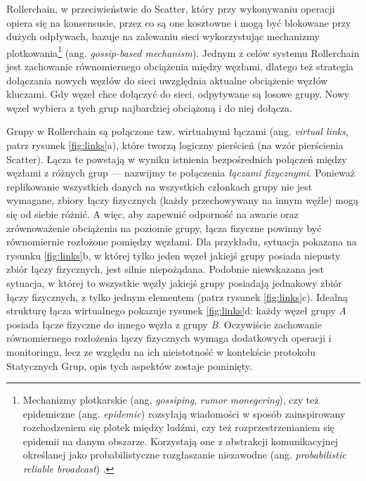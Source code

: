 \documentclass[12pt, twoside, openany]{report}
\begin{document}
Rollerchain, w przeciwieństwie do Scatter, który przy wykonywaniu operacji opiera się na konsensusie, przez co są one kosztowne i mogą być blokowane przy dużych odpływach, bazuje na zalewaniu sieci wykorzystując mechanizmy plotkowania\footnote{Mechanizmy plotkarskie (ang. \textit{gossiping}, \textit{rumor monegering}), czy też epidemiczne (ang. \textit{epidemic}) rozsyłają wiadomości w sposób zainspirowany rozchodzeniem się plotek między ludźmi, czy też rozprzestrzenianiem się epidemii na danym obszarze. Korzystają one z abstrakcji komunikacyjnej określanej jako probabilistyczne rozgłaszanie niezawodne (ang. \textit{probabilistic reliable broadcast}) \cite{bib:pr}.} (ang. \textit{gossip-based mechanism}). Jednym z celów systemu Rollerchain jest zachowanie równomiernego obciążenia między węzłami, dlatego też strategia dołączania nowych węzłów do sieci uwzględnia aktualne obciążenie węzłów kluczami. Gdy węzeł chce dołączyć do sieci, odpytywane są losowe grupy. Nowy węzeł wybiera z tych grup najbardziej obciążoną i do niej dołącza.

Grupy w Rollerchain są połączone tzw. wirtualnymi łączami (ang. \textit{virtual links}, patrz rysunek \ref{fig:links}a), które tworzą logiczny pierścień (na wzór pierścienia Scatter). Łącza te powstają w wyniku istnienia bezpośrednich połączeń między węzłami z różnych grup --- nazwijmy te połączenia \textit{łączami fizycznymi}. Ponieważ replikowanie wszystkich danych na wszystkich członkach grupy nie jest wymagane, zbiory łączy fizycznych (każdy przechowywany na innym węźle) mogą się od siebie różnić. A więc, aby zapewnić odporność na awarie oraz zrównoważenie obciążenia na poziomie grupy, łącza fizyczne powinny być równomiernie rozłożone pomiędzy węzłami. Dla przykładu, sytuacja pokazana na rysunku \ref{fig:links}b, w której tylko jeden węzeł jakiejś grupy posiada niepusty zbiór łączy fizycznych, jest silnie niepożądana. Podobnie niewskazana jest sytuacja, w której to wszystkie węzły jakiejś grupy posiadają jednakowy zbiór łączy fizycznych, z tylko jednym elementem (patrz rysunek \ref{fig:links}c). Idealną strukturę łącza wirtualnego pokazuje rysunek \ref{fig:links}d: każdy węzeł grupy \textit{A} posiada łącze fizyczne do innego węzła z grupy \textit{B}. Oczywiście zachowanie równomiernego rozłożenia łączy fizycznych wymaga dodatkowych operacji i monitoringu, lecz ze względu na ich nieistotność w kontekście protokołu Statycznych Grup, opis tych aspektów zostaje pominięty.
\end{document}
